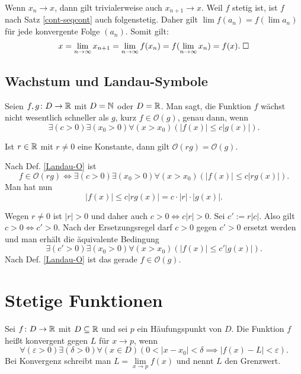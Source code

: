 \begin{Beweis}
Wenn $x_n\to x$, dann gilt trivialerweise auch $x_{n+1}\to x$.
Weil $f$ stetig ist, ist $f$ nach Satz \ref{cont-seqcont}
auch folgenstetig. Daher gilt $\lim f(a_n) = f(\lim a_n)$ für jede
konvergente Folge $(a_n)$. Somit gilt:
\[x=\lim_{n\to\infty} x_{n+1} = \lim_{n\to\infty} f(x_n)
= f(\lim_{n\to\infty} x_n) = f(x).\;\square\]
\end{Beweis}

\subsection{Wachstum und Landau-Symbole}
\begin{Definition}\label{Landau-O}
Seien $f,g\colon D\to\mathbb R$ mit $D=\mathbb N$ oder $D=\mathbb R$. Man sagt, die
Funktion $f$ wächst nicht wesentlich schneller als $g$, kurz
$f\in\mathcal O(g)$, genau dann, wenn
\[\exists(c>0)\exists(x_0>0)\forall(x>x_0)(|f(x)|\le c|g(x)|).\]
\end{Definition}

\begin{Korollar}
Ist $r\in\mathbb R$ mit $r\ne 0$ eine Konstante, dann gilt
$\mathcal O(rg)=\mathcal O(g)$.
\end{Korollar}
\begin{Beweis}
Nach Def. \ref{Landau-O} ist
\[f\in\mathcal O(rg) \iff 
\exists(c>0)\exists(x_0>0)\forall(x>x_0)(|f(x)|\le c|rg(x)|).\]
Man hat nun
\[|f(x)|\le c|rg(x)| = c\cdot |r|\cdot |g(x)|.\]
\end{Beweis}
Wegen $r\ne 0$ ist $|r|>0$ und daher auch $c>0\iff c|r|>0$. Sei
$c':=r|c|$. Also gilt $c>0\iff c'>0$. Nach der Ersetzungsregel
darf $c>0$ gegen $c'>0$ ersetzt werden und man erhält die
äquivalente Bedingung
\[\exists(c'>0)\exists(x_0>0)\forall(x>x_0)(|f(x)|\le c'|g(x)|).\]
Nach Def. \ref{Landau-O} ist das gerade $f\in\mathcal O(g)$.\;\qedsymbol

\section{Stetige Funktionen}

\begin{Definition}\label{fn-lim}
Sei $f\colon D\to\mathbb R$ mit $D\subseteq\mathbb R$ und sei $p$ ein
Häufungspunkt von $D$. Die Funktion $f$ heißt konvergent
gegen $L$ für $x\to p$, wenn%
\[\forall(\varepsilon>0)\exists(\delta>0)\forall(x\in D)(
  0<|x-x_0|<\delta\implies |f(x)-L|<\varepsilon).\]
Bei Konvergenz schreibt man $L=\lim\limits_{x\to p} f(x)$ und nennt $L$ den Grenzwert.
\end{Definition}

